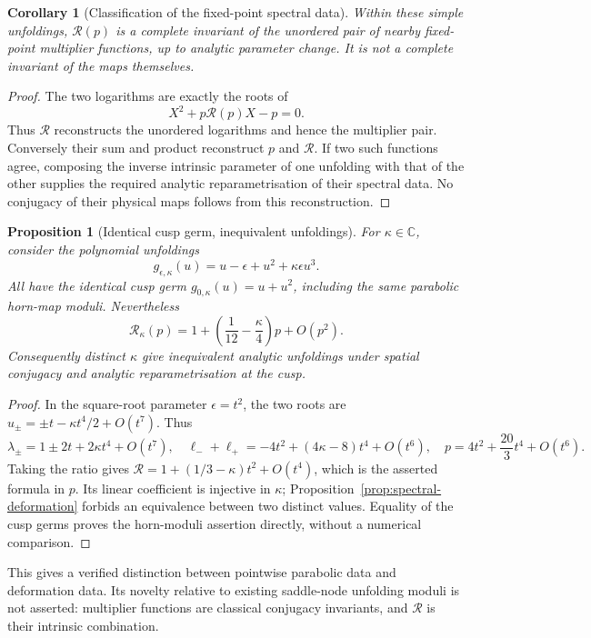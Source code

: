 \documentclass[11pt]{article}
\newtheorem{proposition}[theorem]{Proposition}
\newtheorem{corollary}[theorem]{Corollary}
\newcommand{\C}{\mathbb C}
\begin{document}
\begin{corollary}[Classification of the fixed-point spectral data]
\label{cor:spectral-classification}
Within these simple unfoldings, $\mathcal R(p)$ is a complete invariant
of the unordered pair of nearby fixed-point multiplier functions, up
to analytic parameter change. It is not a complete invariant of the
maps themselves.
\end{corollary}
\begin{proof}
The two logarithms are exactly the roots of
\[
 X^2+p\mathcal R(p)X-p=0.
\]
Thus $\mathcal R$ reconstructs the unordered logarithms and hence the
multiplier pair. Conversely their sum and product reconstruct $p$ and
$\mathcal R$. If two such functions agree, composing the inverse
intrinsic parameter of one unfolding with that of the other supplies
the required analytic reparametrisation of their spectral data. No
conjugacy of their physical maps follows from this reconstruction.
\end{proof}

\begin{proposition}[Identical cusp germ, inequivalent unfoldings]
\label{prop:same-cusp-different-unfolding}
For $\kappa\in\C$, consider the polynomial unfoldings
\[
 g_{\epsilon,\kappa}(u)=u-\epsilon+u^2+\kappa\epsilon u^3.
\]
All have the identical cusp germ $g_{0,\kappa}(u)=u+u^2$, including
the same parabolic horn-map moduli. Nevertheless
\[
 \mathcal R_\kappa(p)
   =1+\left(\frac1{12}-\frac\kappa4\right)p+O(p^2).
\]
Consequently distinct $\kappa$ give inequivalent analytic unfoldings
under spatial conjugacy and analytic reparametrisation at the cusp.
\end{proposition}
\begin{proof}
In the square-root parameter $\epsilon=t^2$, the two roots are
$u_\pm=\pm t-\kappa t^4/2+O(t^7)$. Thus
\[
 \lambda_\pm=1\pm2t+2\kappa t^4+O(t^7),\quad
 \ell_-+\ell_+=-4t^2+(4\kappa-8)t^4+O(t^6),\quad
 p=4t^2+\frac{20}{3}t^4+O(t^6).
\]
Taking the ratio gives
$\mathcal R=1+(1/3-\kappa)t^2+O(t^4)$, which is the asserted
formula in $p$. Its linear coefficient is injective in $\kappa$;
Proposition~\ref{prop:spectral-deformation} forbids an equivalence
between two distinct values. Equality of the cusp germs proves the
horn-moduli assertion directly, without a numerical comparison.
\end{proof}
This gives a verified distinction between pointwise parabolic data
and deformation data. Its novelty relative to existing saddle-node
unfolding moduli is not asserted: multiplier functions are classical
conjugacy invariants, and $\mathcal R$ is their intrinsic combination.
\end{document}
